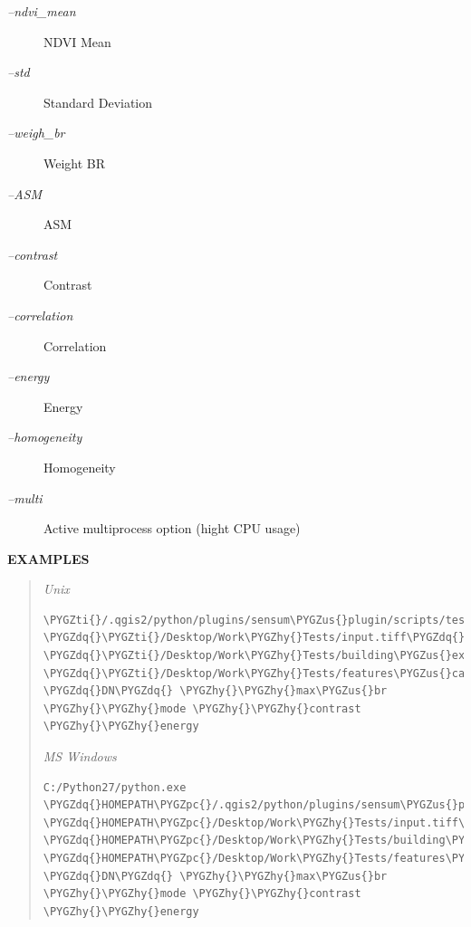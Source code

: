 \documentclass[letterpaper,10pt,english]{sphinxmanual}
\def\PYGZus{\char`\_}
\def\PYGZpc{\char`\%}
\def\PYGZhy{\char`\-}
\def\PYGZdq{\char`\"}
\def\PYGZti{\char`\~}
\begin{document}
\begin{description}
\begin{description}
\item[{\emph{--ndvi\_mean}}] \leavevmode
NDVI Mean

\item[{\emph{--std}}] \leavevmode
Standard Deviation

\item[{\emph{--weigh\_br}}] \leavevmode
Weight BR

\item[{\emph{--ASM}}] \leavevmode
ASM

\item[{\emph{--contrast}}] \leavevmode
Contrast

\item[{\emph{--correlation}}] \leavevmode
Correlation

\item[{\emph{--energy}}] \leavevmode
Energy

\item[{\emph{--homogeneity}}] \leavevmode
Homogeneity

\item[{\emph{--multi}}] \leavevmode
Active multiprocess option (hight CPU usage)

\end{description}

\end{description}

\textbf{EXAMPLES}
\begin{quote}

\emph{Unix}

\begin{Verbatim}[frame=single,commandchars=\\\{\}]
\PYGZti{}/.qgis2/python/plugins/sensum\PYGZus{}plugin/scripts/test\PYGZus{}features.py \PYGZdq{}\PYGZti{}/Desktop/Work\PYGZhy{}Tests/input.tiff\PYGZdq{} \PYGZdq{}\PYGZti{}/Desktop/Work\PYGZhy{}Tests/building\PYGZus{}extraction.shp\PYGZdq{} \PYGZdq{}\PYGZti{}/Desktop/Work\PYGZhy{}Tests/features\PYGZus{}calculation.shp\PYGZdq{} \PYGZdq{}DN\PYGZdq{} \PYGZhy{}\PYGZhy{}max\PYGZus{}br \PYGZhy{}\PYGZhy{}mode \PYGZhy{}\PYGZhy{}contrast \PYGZhy{}\PYGZhy{}energy
\end{Verbatim}

\emph{MS Windows}

\begin{Verbatim}[frame=single,commandchars=\\\{\}]
C:/Python27/python.exe \PYGZdq{}HOMEPATH\PYGZpc{}/.qgis2/python/plugins/sensum\PYGZus{}plugin/scripts/test\PYGZus{}features.py\PYGZdq{} \PYGZdq{}HOMEPATH\PYGZpc{}/Desktop/Work\PYGZhy{}Tests/input.tiff\PYGZdq{} \PYGZdq{}HOMEPATH\PYGZpc{}/Desktop/Work\PYGZhy{}Tests/building\PYGZus{}extraction.shp\PYGZdq{} \PYGZdq{}HOMEPATH\PYGZpc{}/Desktop/Work\PYGZhy{}Tests/features\PYGZus{}calculation.shp\PYGZdq{} \PYGZdq{}DN\PYGZdq{} \PYGZhy{}\PYGZhy{}max\PYGZus{}br \PYGZhy{}\PYGZhy{}mode \PYGZhy{}\PYGZhy{}contrast \PYGZhy{}\PYGZhy{}energy
\end{Verbatim}
\end{quote}
\end{document}
